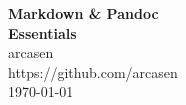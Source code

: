 \begin{titlepage}
  \centering
  \vspace*{3cm}
  {\Huge\textbf{Markdown \& Pandoc\\Essentials}\\}
  \vspace*{1.5cm}
  {\large{arcasen}}\\
  \vspace*{12cm}
  {\large{https://github.com/arcasen}}\\
  \vspace*{1cm}
  {\normalsize\today}
  \vfill
\end{titlepage}